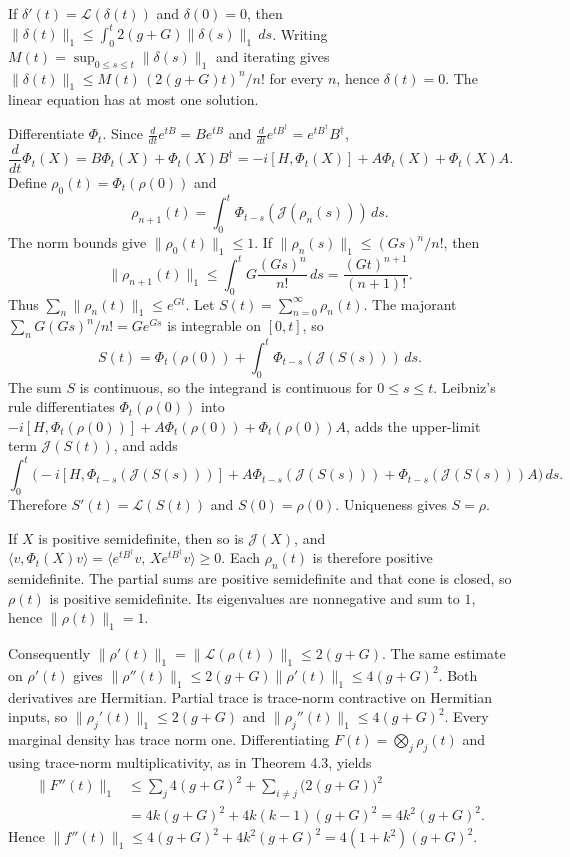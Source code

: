 \documentclass[
  11pt,
]{article}
\begin{document}
If \(\delta'(t)=\mathcal L(\delta(t))\) and \(\delta(0)=0\), then
\(\|\delta(t)\|_1\le\int_0^t 2(g+G)\|\delta(s)\|_1\,ds\). Writing
\(M(t)=\sup_{0\le s\le t}\|\delta(s)\|_1\) and iterating gives
\(\|\delta(t)\|_1\le M(t)\,(2(g+G)t)^n/n!\) for every \(n\), hence
\(\delta(t)=0\). The linear equation has at most one solution.

Differentiate \(\Phi_t\). Since
\(\frac{d}{dt}e^{tB}=Be^{tB}\) and
\(\frac{d}{dt}e^{tB^\dagger}=e^{tB^\dagger}B^\dagger\),
\[
\frac{d}{dt}\Phi_t(X)
=B\Phi_t(X)+\Phi_t(X)B^\dagger
=-i[H,\Phi_t(X)]+A\Phi_t(X)+\Phi_t(X)A.
\]
Define \(\rho_0(t)=\Phi_t(\rho(0))\) and
\[
\rho_{n+1}(t)
=\int_0^t\Phi_{t-s}(\mathcal J(\rho_n(s)))\,ds.
\]
The norm bounds give \(\|\rho_0(t)\|_1\le 1\). If
\(\|\rho_n(s)\|_1\le (Gs)^n/n!\), then
\[
\|\rho_{n+1}(t)\|_1
\le\int_0^t G\frac{(Gs)^n}{n!}\,ds
=\frac{(Gt)^{n+1}}{(n+1)!}.
\]
Thus \(\sum_n\|\rho_n(t)\|_1\le e^{Gt}\). Let
\(S(t)=\sum_{n=0}^\infty\rho_n(t)\). The majorant
\(\sum_n G(Gs)^n/n!=Ge^{Gs}\) is integrable on \([0,t]\), so
\[
S(t)
=\Phi_t(\rho(0))
+\int_0^t\Phi_{t-s}(\mathcal J(S(s)))\,ds.
\]
The sum \(S\) is continuous, so the integrand is continuous for
\(0\le s\le t\). Leibniz's rule differentiates
\(\Phi_t(\rho(0))\) into
\(-i[H,\Phi_t(\rho(0))]+A\Phi_t(\rho(0))+\Phi_t(\rho(0))A\), adds the
upper-limit term \(\mathcal J(S(t))\), and adds
\[
\int_0^t
\bigl(
-i[H,\Phi_{t-s}(\mathcal J(S(s)))]
+A\Phi_{t-s}(\mathcal J(S(s)))
+\Phi_{t-s}(\mathcal J(S(s)))A
\bigr)\,ds.
\]
Therefore \(S'(t)=\mathcal L(S(t))\) and \(S(0)=\rho(0)\). Uniqueness
gives \(S=\rho\).

If \(X\) is positive semidefinite, then so is \(\mathcal J(X)\), and
\(\langle v,\Phi_t(X)v\rangle
=\langle e^{tB^\dagger}v,\,X e^{tB^\dagger}v\rangle\ge 0\).
Each \(\rho_n(t)\) is therefore positive semidefinite. The partial sums
are positive semidefinite and that cone is closed, so \(\rho(t)\) is
positive semidefinite. Its eigenvalues are nonnegative and sum to \(1\),
hence \(\|\rho(t)\|_1=1\).

Consequently
\(\|\rho'(t)\|_1=\|\mathcal L(\rho(t))\|_1\le 2(g+G)\). The same
estimate on \(\rho'(t)\) gives
\(\|\rho''(t)\|_1\le 2(g+G)\|\rho'(t)\|_1\le 4(g+G)^2\). Both
derivatives are Hermitian. Partial trace is trace-norm contractive on
Hermitian inputs, so \(\|\rho_j'(t)\|_1\le 2(g+G)\) and
\(\|\rho_j''(t)\|_1\le 4(g+G)^2\). Every marginal density has trace
norm one. Differentiating \(F(t)=\bigotimes_j\rho_j(t)\) and using
trace-norm multiplicativity, as in Theorem 4.3, yields
\[
\begin{aligned}
\|F''(t)\|_1
&\le\sum_j 4(g+G)^2
+\sum_{i\ne j}\bigl(2(g+G)\bigr)^2\\
&=4k(g+G)^2+4k(k-1)(g+G)^2
=4k^2(g+G)^2.
\end{aligned}
\]
Hence
\(\|f''(t)\|_1\le 4(g+G)^2+4k^2(g+G)^2=4(1+k^2)(g+G)^2\).
\end{document}
